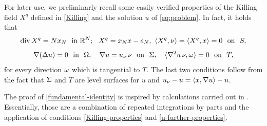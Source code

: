 \documentclass[a4paper,10pt]{amsart}
\numberwithin{equation}{section}
\begin{document}
For later use, we preliminarly recall some easily verified properties of the Killing field $X^q$ defined in \eqref{Killing} and the solution $u$ of \eqref{eq:problem}.
In fact, it holds that
\begin{equation}
\label{Killing-properties}
\mathop{\mathrm{div}} X^q= N x_N \ \mbox{ in } \mathbb{R}^N; \ \  X^q= x_N x - e_N, \
\langle X^q, \nu\rangle=\langle X^q, x\rangle=0 \ \text{ on } \ S,
\end{equation}
\begin{equation}
\label{u-further-properties}
\nabla (\Delta u)=0 \ \mbox{ in } \ \Omega, \quad \nabla u=u_\nu\,\nu \ \mbox{ on } \ \Sigma, \quad
\langle \nabla^2 u\,\nu, \omega\rangle=0 \ \mbox{ on } \ T,
\end{equation}
for every direction $\omega$ which is tangential to $T$. The last two conditions follow from the fact that $\Sigma$ and $T$ are level surfaces for $u$ and $u_\nu-u=\langle x,\nabla u\rangle-u$.
\par
The proof of \eqref{fundamental-identity} is inspired by calculations carried out in \cite{GX}. 
Essentially, those are a combination of repeated integrations by parts and the application of conditions \eqref{Killing-properties} and \eqref{u-further-properties}. 
\end{document}
